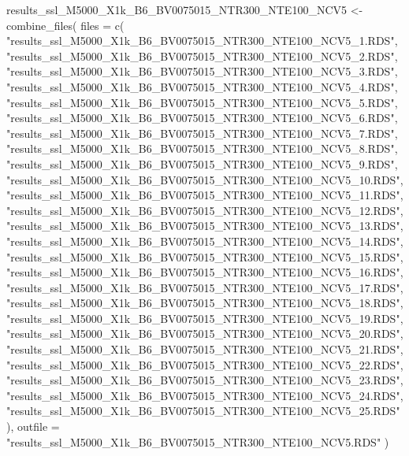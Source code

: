 \documentclass[
]{article}
\newenvironment{Shaded}{\begin{snugshade}}{\end{snugshade}}
\newcommand{\AttributeTok}[1]{\textcolor[rgb]{0.77,0.63,0.00}{#1}}
\newcommand{\FunctionTok}[1]{\textcolor[rgb]{0.00,0.00,0.00}{#1}}
\newcommand{\NormalTok}[1]{#1}
\newcommand{\OtherTok}[1]{\textcolor[rgb]{0.56,0.35,0.01}{#1}}
\newcommand{\StringTok}[1]{\textcolor[rgb]{0.31,0.60,0.02}{#1}}
\begin{document}
\begin{Shaded}
\begin{Highlighting}[]
\NormalTok{results\_ssl\_M5000\_X1k\_B6\_BV0075015\_NTR300\_NTE100\_NCV5 }\OtherTok{\textless{}{-}} \FunctionTok{combine\_files}\NormalTok{(}
  \AttributeTok{files =} \FunctionTok{c}\NormalTok{(}
    \StringTok{"results\_ssl\_M5000\_X1k\_B6\_BV0075015\_NTR300\_NTE100\_NCV5\_1.RDS"}\NormalTok{,}
    \StringTok{"results\_ssl\_M5000\_X1k\_B6\_BV0075015\_NTR300\_NTE100\_NCV5\_2.RDS"}\NormalTok{,}
    \StringTok{"results\_ssl\_M5000\_X1k\_B6\_BV0075015\_NTR300\_NTE100\_NCV5\_3.RDS"}\NormalTok{,}
    \StringTok{"results\_ssl\_M5000\_X1k\_B6\_BV0075015\_NTR300\_NTE100\_NCV5\_4.RDS"}\NormalTok{,}
    \StringTok{"results\_ssl\_M5000\_X1k\_B6\_BV0075015\_NTR300\_NTE100\_NCV5\_5.RDS"}\NormalTok{,}
    \StringTok{"results\_ssl\_M5000\_X1k\_B6\_BV0075015\_NTR300\_NTE100\_NCV5\_6.RDS"}\NormalTok{,}
    \StringTok{"results\_ssl\_M5000\_X1k\_B6\_BV0075015\_NTR300\_NTE100\_NCV5\_7.RDS"}\NormalTok{,}
    \StringTok{"results\_ssl\_M5000\_X1k\_B6\_BV0075015\_NTR300\_NTE100\_NCV5\_8.RDS"}\NormalTok{,}
    \StringTok{"results\_ssl\_M5000\_X1k\_B6\_BV0075015\_NTR300\_NTE100\_NCV5\_9.RDS"}\NormalTok{,}
    \StringTok{"results\_ssl\_M5000\_X1k\_B6\_BV0075015\_NTR300\_NTE100\_NCV5\_10.RDS"}\NormalTok{,}
    \StringTok{"results\_ssl\_M5000\_X1k\_B6\_BV0075015\_NTR300\_NTE100\_NCV5\_11.RDS"}\NormalTok{,}
    \StringTok{"results\_ssl\_M5000\_X1k\_B6\_BV0075015\_NTR300\_NTE100\_NCV5\_12.RDS"}\NormalTok{,}
    \StringTok{"results\_ssl\_M5000\_X1k\_B6\_BV0075015\_NTR300\_NTE100\_NCV5\_13.RDS"}\NormalTok{,}
    \StringTok{"results\_ssl\_M5000\_X1k\_B6\_BV0075015\_NTR300\_NTE100\_NCV5\_14.RDS"}\NormalTok{,}
    \StringTok{"results\_ssl\_M5000\_X1k\_B6\_BV0075015\_NTR300\_NTE100\_NCV5\_15.RDS"}\NormalTok{,}
    \StringTok{"results\_ssl\_M5000\_X1k\_B6\_BV0075015\_NTR300\_NTE100\_NCV5\_16.RDS"}\NormalTok{,}
    \StringTok{"results\_ssl\_M5000\_X1k\_B6\_BV0075015\_NTR300\_NTE100\_NCV5\_17.RDS"}\NormalTok{,}
    \StringTok{"results\_ssl\_M5000\_X1k\_B6\_BV0075015\_NTR300\_NTE100\_NCV5\_18.RDS"}\NormalTok{,}
    \StringTok{"results\_ssl\_M5000\_X1k\_B6\_BV0075015\_NTR300\_NTE100\_NCV5\_19.RDS"}\NormalTok{,}
    \StringTok{"results\_ssl\_M5000\_X1k\_B6\_BV0075015\_NTR300\_NTE100\_NCV5\_20.RDS"}\NormalTok{,}
    \StringTok{"results\_ssl\_M5000\_X1k\_B6\_BV0075015\_NTR300\_NTE100\_NCV5\_21.RDS"}\NormalTok{,}
    \StringTok{"results\_ssl\_M5000\_X1k\_B6\_BV0075015\_NTR300\_NTE100\_NCV5\_22.RDS"}\NormalTok{,}
    \StringTok{"results\_ssl\_M5000\_X1k\_B6\_BV0075015\_NTR300\_NTE100\_NCV5\_23.RDS"}\NormalTok{,}
    \StringTok{"results\_ssl\_M5000\_X1k\_B6\_BV0075015\_NTR300\_NTE100\_NCV5\_24.RDS"}\NormalTok{,}
    \StringTok{"results\_ssl\_M5000\_X1k\_B6\_BV0075015\_NTR300\_NTE100\_NCV5\_25.RDS"}
\NormalTok{  ),}
  \AttributeTok{outfile =} \StringTok{"results\_ssl\_M5000\_X1k\_B6\_BV0075015\_NTR300\_NTE100\_NCV5.RDS"}
\NormalTok{)}


\end{Highlighting}
\end{Shaded}
\end{document}
